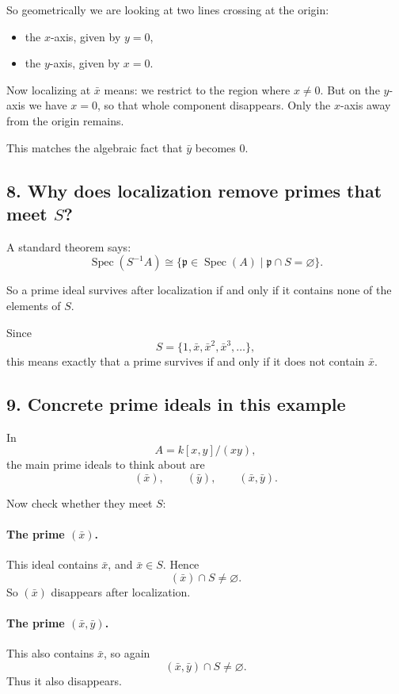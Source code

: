 \documentclass[12pt,a4paper]{article}
\theoremstyle{notespace}
\DeclareMathOperator{\Spec}{Spec}
\begin{document}
So geometrically we are looking at two lines crossing at the origin:
\begin{itemize}
	\item the \(x\)-axis, given by \(y=0\),
	\item the \(y\)-axis, given by \(x=0\).
\end{itemize}

Now localizing at \(\bar x\) means: we restrict to the region where \(x\neq 0\). But on the \(y\)-axis we have \(x=0\), so that whole component disappears. Only the \(x\)-axis away from the origin remains.

This matches the algebraic fact that \(\bar y\) becomes \(0\).

\subsection*{8. Why does localization remove primes that meet \(S\)?}

A standard theorem says:
\[
\Spec(S^{-1}A)\cong
\{\mathfrak p\in\Spec(A)\mid \mathfrak p\cap S=\varnothing\}.
\]

So a prime ideal survives after localization if and only if it contains none of the elements of \(S\).

Since
\[
S=\{1,\bar x,\bar x^2,\bar x^3,\dots\},
\]
this means exactly that a prime survives if and only if it does not contain \(\bar x\).

\subsection*{9. Concrete prime ideals in this example}

In
\[
A=k[x,y]/(xy),
\]
the main prime ideals to think about are
\[
(\bar x), \qquad (\bar y), \qquad (\bar x,\bar y).
\]

Now check whether they meet \(S\):

\paragraph{The prime \((\bar x)\).}
This ideal contains \(\bar x\), and \(\bar x\in S\). Hence
\[
(\bar x)\cap S\neq\varnothing.
\]
So \((\bar x)\) disappears after localization.

\paragraph{The prime \((\bar x,\bar y)\).}
This also contains \(\bar x\), so again
\[
(\bar x,\bar y)\cap S\neq\varnothing.
\]
Thus it also disappears.
\end{document}
